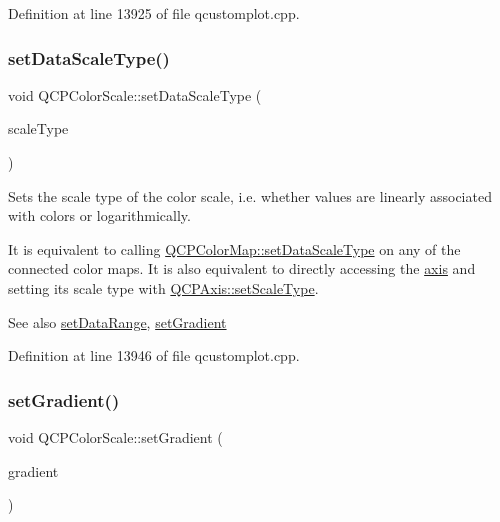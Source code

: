 Definition at line 13925 of file qcustomplot.\+cpp.

\mbox{\label{class_q_c_p_color_scale_aeb6107d67dd7325145b2498abae67fc3}} 
\subsubsection{\texorpdfstring{set\+Data\+Scale\+Type()}{setDataScaleType()}}
{\footnotesize\ttfamily void Q\+C\+P\+Color\+Scale\+::set\+Data\+Scale\+Type (\begin{DoxyParamCaption}\item[{\hyperlink{class_q_c_p_axis_a36d8e8658dbaa179bf2aeb973db2d6f0}{Q\+C\+P\+Axis\+::\+Scale\+Type}}]{scale\+Type }\end{DoxyParamCaption})}

Sets the scale type of the color scale, i.\+e. whether values are linearly associated with colors or logarithmically.

It is equivalent to calling \hyperlink{class_q_c_p_color_map_a9d20aa08e3c1f20f22908c45b9c06511}{Q\+C\+P\+Color\+Map\+::set\+Data\+Scale\+Type} on any of the connected color maps. It is also equivalent to directly accessing the \hyperlink{class_q_c_p_color_scale_a39bdbdb3b212602a5a57f9f3ea444190}{axis} and setting its scale type with \hyperlink{class_q_c_p_axis_adef29cae617af4f519f6c40d1a866ca6}{Q\+C\+P\+Axis\+::set\+Scale\+Type}.

\begin{DoxySeeAlso}{See also}
\hyperlink{class_q_c_p_color_scale_abe88633003a26d1e756aa74984587fef}{set\+Data\+Range}, \hyperlink{class_q_c_p_color_scale_a1f29583bb6f1e7f473b62fb712be3940}{set\+Gradient} 
\end{DoxySeeAlso}


Definition at line 13946 of file qcustomplot.\+cpp.

\mbox{\label{class_q_c_p_color_scale_a1f29583bb6f1e7f473b62fb712be3940}} 
\subsubsection{\texorpdfstring{set\+Gradient()}{setGradient()}}
{\footnotesize\ttfamily void Q\+C\+P\+Color\+Scale\+::set\+Gradient (\begin{DoxyParamCaption}\item[{const \hyperlink{class_q_c_p_color_gradient}{Q\+C\+P\+Color\+Gradient} \&}]{gradient }\end{DoxyParamCaption})}

